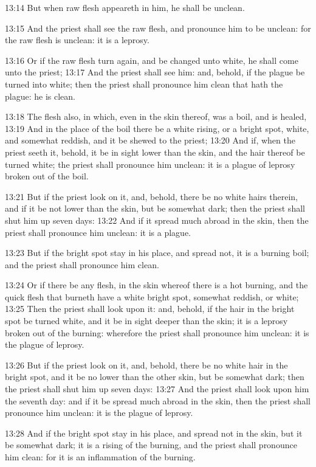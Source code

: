 13:14 But when raw flesh appeareth in him, he shall be unclean.

13:15 And the priest shall see the raw flesh, and pronounce him to be
unclean: for the raw flesh is unclean: it is a leprosy.

13:16 Or if the raw flesh turn again, and be changed unto white, he
shall come unto the priest; 13:17 And the priest shall see him: and,
behold, if the plague be turned into white; then the priest shall
pronounce him clean that hath the plague: he is clean.

13:18 The flesh also, in which, even in the skin thereof, was a boil,
and is healed, 13:19 And in the place of the boil there be a white
rising, or a bright spot, white, and somewhat reddish, and it be
shewed to the priest; 13:20 And if, when the priest seeth it, behold,
it be in sight lower than the skin, and the hair thereof be turned
white; the priest shall pronounce him unclean: it is a plague of
leprosy broken out of the boil.

13:21 But if the priest look on it, and, behold, there be no white
hairs therein, and if it be not lower than the skin, but be somewhat
dark; then the priest shall shut him up seven days: 13:22 And if it
spread much abroad in the skin, then the priest shall pronounce him
unclean: it is a plague.

13:23 But if the bright spot stay in his place, and spread not, it is
a burning boil; and the priest shall pronounce him clean.

13:24 Or if there be any flesh, in the skin whereof there is a hot
burning, and the quick flesh that burneth have a white bright spot,
somewhat reddish, or white; 13:25 Then the priest shall look upon it:
and, behold, if the hair in the bright spot be turned white, and it be
in sight deeper than the skin; it is a leprosy broken out of the
burning: wherefore the priest shall pronounce him unclean: it is the
plague of leprosy.

13:26 But if the priest look on it, and, behold, there be no white
hair in the bright spot, and it be no lower than the other skin, but
be somewhat dark; then the priest shall shut him up seven days: 13:27
And the priest shall look upon him the seventh day: and if it be
spread much abroad in the skin, then the priest shall pronounce him
unclean: it is the plague of leprosy.

13:28 And if the bright spot stay in his place, and spread not in the
skin, but it be somewhat dark; it is a rising of the burning, and the
priest shall pronounce him clean: for it is an inflammation of the
burning.

